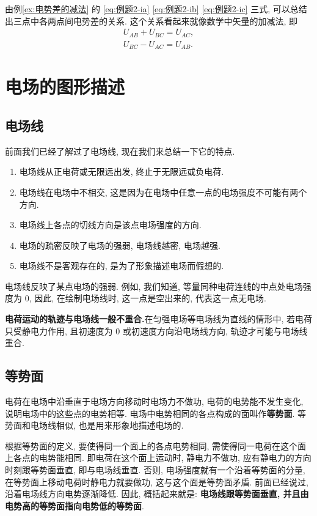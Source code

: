 \documentclass[UTF8,openany,fontset=fandol]{ctexbook}
\theoremstyle{chinesetextbook}
\begin{document}
由例\ref{ex:电势差的减法} 的 \eqref{eq:例题2-ia} \eqref{eq:例题2-ib} \eqref{eq:例题2-ic} 三式, 可以总结出三点中各两点间电势差的关系. 这个关系看起来就像数学中矢量的加减法, 即
\[
\begin{gathered}
U_{AB}+U_{BC}=U_{AC},\\
U_{BC}-U_{AC}=U_{AB}.
\end{gathered}
\]
\section{电场的图形描述}\label{sec:电场的图形描述}
\subsection{电场线}
前面我们已经了解过了电场线, 现在我们来总结一下它的特点.
\begin{enumerate}
\item 电场线从正电荷或无限远出发, 终止于无限远或负电荷.
\item 电场线在电场中不相交, 这是因为在电场中任意一点的电场强度不可能有两个方向.
\item 电场线上各点的切线方向是该点电场强度的方向.
\item 电场的疏密反映了电场的强弱, 电场线越密, 电场越强.
\item 电场线不是客观存在的, 是为了形象描述电场而假想的.
\end{enumerate}

电场线反映了某点电场的强弱. 例如, 我们知道, 等量同种电荷连线的中点处电场强度为 0, 因此, 在绘制电场线时, 这一点是空出来的, 代表这一点无电场.

\textbf{电荷运动的轨迹与电场线一般不重合.}在匀强电场等电场线为直线的情形中, 若电荷只受静电力作用, 且初速度为 0 或初速度方向沿电场线方向, 轨迹才可能与电场线重合.
\subsection{等势面}
电荷在电场中沿垂直于电场方向移动时电场力不做功, 电荷的电势能不发生变化, 说明电场中的这些点的电势相等. 电场中电势相同的各点构成的面叫作\textbf{等势面}. 等势面和电场线相似, 也是用来形象地描述电场的.

根据等势面的定义, 要使得同一个面上的各点电势相同, 需使得同一电荷在这个面上各点的电势能相同. 即电荷在这个面上运动时, 静电力不做功, 应有静电力的方向时刻跟等势面垂直, 即与电场线垂直. 否则, 电场强度就有一个沿着等势面的分量, 在等势面上移动电荷时静电力就要做功, 这与这个面是等势面矛盾. 前面已经说过, 沿着电场线方向电势逐渐降低. 因此, 概括起来就是: \textbf{电场线跟等势面垂直, 并且由电势高的等势面指向电势低的等势面}.
\end{document}
